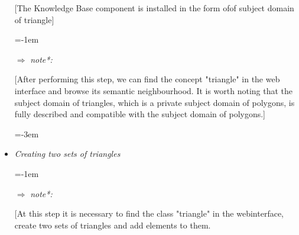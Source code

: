 \documentclass{article}
\begin{document}
\begin{multicols}{2}
\begin{itemize}
\leftskip=0pt
[The Knowledge Base component
is installed in the form ofof subject domain of triangle] \par
\leftskip=-1em
\item[$\Rightarrow$] \quad
\textit{note*:} \par
\leftskip=0pt
[After performing this step, we
can find the concept "triangle"
in the web interface and browse
its semantic neighbourhood. It is
worth noting that the subject domain of triangles, which is a private subject domain of polygons,
is fully described and compatible
with the subject domain of polygons.] \par
\leftskip=-3em
\item\quad\textit{Creating two sets of triangles} \par
\leftskip=-1em
\item[$\Rightarrow$] \quad
\textit{note*:} \par
\leftskip=0pt
[At this step it is necessary to find
the class "triangle" in the webinterface, create two sets of triangles and add elements to them.

\columnbreak


\end{itemize}
\end{multicols}
\end{document}

